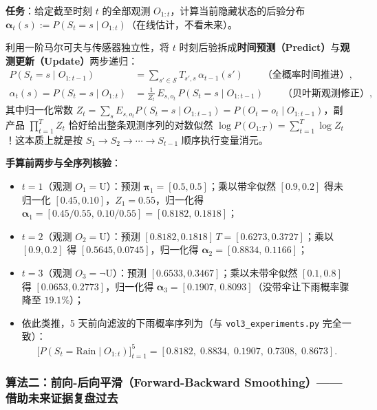 \textbf{任务}：给定截至时刻 $t$ 的全部观测 $O_{1:t}$，计算当前隐藏状态的后验分布 $\boldsymbol{\alpha}_t(s) := P(S_t = s \mid O_{1:t})$（在线估计，不看未来）。

利用一阶马尔可夫与传感器独立性，将 $t$ 时刻后验拆成\textbf{时间预测（Predict）}与\textbf{观测更新（Update）}两步递归：
\begin{align}
  P(S_t = s \mid O_{1:t-1}) &= \sum_{s' \in \mathcal{S}} T_{s', s}\, \alpha_{t-1}(s') \qquad\text{（全概率时间推进）}, \label{eq:hmm-pred}\\
  \alpha_t(s) = P(S_t = s \mid O_{1:t}) &= \frac{1}{Z_t}\, E_{s, o_t}\, P(S_t = s \mid O_{1:t-1}) \qquad\text{（贝叶斯观测修正）}, \label{eq:hmm-upd}
\end{align}
其中归一化常数 $Z_t = \sum_s E_{s, o_t} P(S_t=s \mid O_{1:t-1}) = P(O_t = o_t \mid O_{1:t-1})$，副产品 $\prod_{t=1}^T Z_t$ 恰好给出整条观测序列的对数似然 $\log P(O_{1:T}) = \sum_{t=1}^T \log Z_t$！这本质上就是按 $S_1 \to S_2 \to \cdots \to S_{t-1}$ 顺序执行变量消元。

\textbf{手算前两步与全序列核验}：
\begin{itemize}
  \item $t=1$（观测 $O_1=\text{U}$）：预测 $\boldsymbol{\pi}_1 = [0.5, 0.5]$；乘以带伞似然 $[0.9, 0.2]$ 得未归一化 $[0.45, 0.10]$，$Z_1 = 0.55$，归一化得 $\boldsymbol{\alpha}_1 = [0.45/0.55,\, 0.10/0.55] = [\mathbf{0.8182},\, 0.1818]$；
  \item $t=2$（观测 $O_2=\text{U}$）：预测 $[0.8182, 0.1818]\,T = [0.6273, 0.3727]$；乘以 $[0.9, 0.2]$ 得 $[0.5645, 0.0745]$，归一化得 $\boldsymbol{\alpha}_2 = [\mathbf{0.8834},\, 0.1166]$；
  \item $t=3$（观测 $O_3=\neg\text{U}$）：预测 $[0.6533, 0.3467]$；乘以未带伞似然 $[0.1, 0.8]$ 得 $[0.0653, 0.2773]$，归一化得 $\boldsymbol{\alpha}_3 = [\mathbf{0.1907},\, 0.8093]$（没带伞让下雨概率骤降至 $19.1\%$）；
  \item 依此类推，5 天前向滤波的下雨概率序列为（与 \texttt{vol3\_experiments.py} 完全一致）：
  \[
    \big[P(S_t = \text{Rain} \mid O_{1:t})\big]_{t=1}^5
    = [\mathbf{0.8182},\; \mathbf{0.8834},\; \mathbf{0.1907},\; \mathbf{0.7308},\; \mathbf{0.8673}].
  \]
\end{itemize}

\subsubsection{算法二：前向-后向平滑（Forward-Backward Smoothing）——借助未来证据复盘过去}

